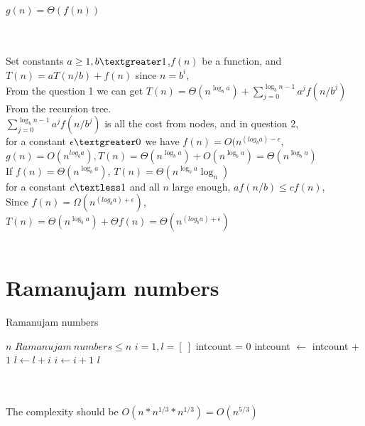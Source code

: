 \documentclass{article}
\begin{document}
\\$g(n) = \Theta(f(n))$
\\\\
\\Set constants $a \geq 1, b \textgreater 1$,$f (n)$ be a function, and $T(n) =aT(n/b) + f (n)$ since $n = b^i$, 
\\From the question 1 we can get  $T(n) = \Theta (n^{\log_b a})+\sum_{j=0}^{\log_b n -1}a^jf(n/b^j)$ From the recursion tree.
\\$\sum_{j=0}^{\log_b n -1}a^jf(n/b^j)$ is all the cost from nodes, and in question 2,
\\for a constant $\epsilon \textgreater 0 $ we have $f(n) = O(n^{(log_b a)-\epsilon}$, 
$g(n) = O (n^{log_b a}), T(n) = \Theta (n^{\log_b a}) + O (n^{\log_b a}) = \Theta (n^{\log_b a})$ 
\\If $f(n) = \Theta (n^{\log_b a})$, $T(n)=\Theta (n^{\log_b a} \log_n)$
\\for a constant $c\textless 1$ and all $n$ large enough, $af(n/b) \leq cf(n)$, 
\\Since $f(n) = \Omega (n^{(log_b a)+\epsilon })$, $T(n)=\Theta (n^{\log_b a})+\Theta f(n) = \Theta (n^{(log_b a)+\epsilon })$
\\\\
\section{Ramanujam numbers}
\begin{algorithm}
    \caption{Ramanujam numbers}
    \begin{algorithmic}[1]
    \Require $n$
    \Ensure $Ramanujam\ numbers \leq n$
    \State $i = 1,l = [\ ]$
    \State intcount = 0
    \State intcount $\gets$ intcount + $1$
    \EndIf 
    \EndFor
    \EndFor
    \State $l \gets l + i$
    \EndIf
    \State $i \gets i+1$
    \EndWhile
    \State \Return $l$
    \EndFunction
    \end{algorithmic}
\end{algorithm}
\\\\
The complexity should be $ O(n*n^{1/3}*n^{1/3})=O(n^{5/3})$
\\
\\
\\
\end{document}
